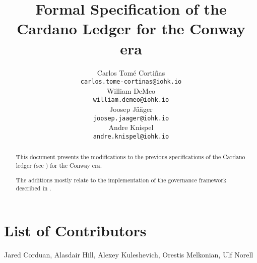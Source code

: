 \documentclass[11pt,a4paper,dvipsnames]{article}
\begin{document}
\title{Formal Specification of the Cardano Ledger for the Conway era}

\author{
   Carlos Tom\'{e} Corti\~{n}as \\ {\small \texttt{carlos.tome-cortinas@iohk.io}} \\
   William DeMeo                \\ {\small \texttt{william.demeo@iohk.io}} \\
   Joosep Jääger                \\ {\small \texttt{joosep.jaager@iohk.io}} \\
   Andre Knispel                \\ {\small \texttt{andre.knispel@iohk.io}} \\
   }

\date{}

\maketitle

\begin{abstract}
  This document presents the modifications to the previous
  specifications of the Cardano ledger (see
  \cite{shelley-ledger-spec,shelley-ma-ledger-spec,alonzo-ledger-spec,babbage-ledger-spec})
  for the Conway era.

  The additions mostly relate to the implementation of the governance
  framework described in \cite{cip1694}.
\end{abstract}

\section*{List of Contributors}
\label{acknowledgements}

Jared Corduan, Alasdair Hill, Alexey Kuleshevich, Orestis Melkonian, Ulf Norell

\tableofcontents
















\clearpage

\printbibliography

\clearpage

\appendix




\end{document}
